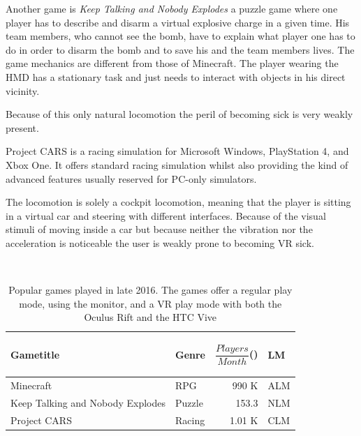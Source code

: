 Another game is \textit{Keep Talking and Nobody Explodes} a puzzle game where one player has to describe and disarm a virtual explosive charge in a given time. His team members, who cannot see the bomb, have to explain what player one has to do in order to disarm the bomb and to save his and the team members lives. The game mechanics are different from those of Minecraft. The player wearing the HMD has a stationary task and just needs to interact with objects in his direct vicinity. 

Because of this only natural locomotion the peril of becoming sick is very weakly present.

Project CARS is a racing simulation for Microsoft Windows, PlayStation 4, and Xbox One. It offers standard racing simulation whilst also providing the kind of advanced features usually reserved for PC-only simulators.

The locomotion is solely a cockpit locomotion, meaning that the player is sitting in a virtual car and steering with different interfaces. Because of the visual stimuli of moving inside a car but because neither the vibration nor the acceleration is noticeable the user is weakly prone to becoming VR sick.

\begin{table}%
	\caption{Popular games played in late 2016. The games offer a regular play mode, using the monitor, and a VR play mode with both the Oculus Rift and the HTC Vive}~\label{tab:popularGames}
	
	\renewcommand{\arraystretch}{1.3}%
	\begin{tabular*}{\columnwidth}{ p{33mm} l r l }
		Gametitle & Genre\footnotemark & \parbox[c][2.2em][t]{2cm}{\begin{flushright}$\dfrac{Players}{Month}$(\footnotemark)\end{flushright}} & LM\footnotemark \\
		\hline
		Minecraft & RPG & 990 K & ALM \\
		Keep Talking and \newline Nobody Explodes & Puzzle & 153.3 & NLM \\
		Project CARS & Racing & 1.01 K & CLM\\
	\end{tabular*}
	
\end{table}



